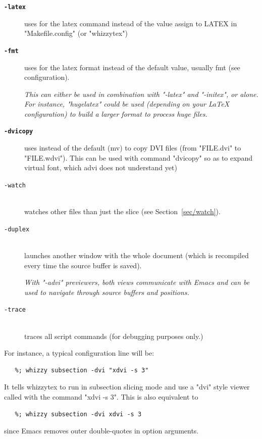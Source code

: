 \documentclass[12pt]{article}
\begin{document}
\begin{description}
\begin{description}
\item[{\bf {\tt -latex }}]\indent

uses  for the latex command instead of the value 
assign to LATEX in \lst"Makefile.config" (or \lst"whizzytex")

\item[{\bf {\tt -fmt }}]\indent

uses  for the latex format instead
of the default value, usually fmt (see configuration).

{\em This can either be used in combination with \lst"-latex" and
\lst"-initex", 
or alone. For instance,
\lst"hugelatex" could be used (depending on your {\LaTeX} configuration) to
build a larger format to process huge files.}
\label{configuration.tex}

\item[{\bf {\tt -dvicopy }}]\indent
\label {sec/dvicopy}

uses  instead of the default (mv) to copy DVI files
(from \lst"FILE.dvi" to \lst"FILE.wdvi"). This can be used with command
\lst"dvicopy" so as  to expand virtual font, which advi does not understand
yet) 

\item[\texttt{-watch}]\indent\\
watches other files than just the slice (see Section~\ref {sec/watch}).

\item[\texttt{-duplex}]\indent\\
launches another window with the whole document (which is
recompiled every time the source buffer is saved).

{\em With \lst"-advi" previewers, both views  communicate with Emacs and can be
used to navigate through source buffers and positions.}

\item[\texttt{-trace}]\indent\\
traces all script commands (for debugging purposes only.)
\label{configuration.trace}

\end{description}

For instance, a typical configuration line will be:
\begin{verbatim}
   %; whizzy subsection -dvi "xdvi -s 3"
\end{verbatim}
It tells whizzytex to run in subsection slicing mode and use a \lst"dvi"
style viewer called with the command
\lst"xdvi -s 3". This is also equivalent to
\begin{verbatim}
   %; whizzy subsection -dvi xdvi -s 3
\end{verbatim}
since Emacs removes outer double-quotes in option arguments. 


\end{description}
\end{document}

